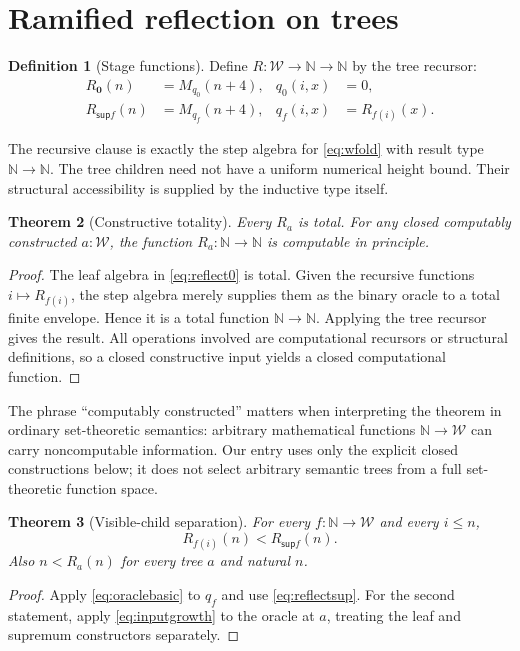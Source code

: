 \documentclass[11pt]{article}
\newtheorem{theorem}{Theorem}[section]
\theoremstyle{definition}
\newtheorem{definition}[theorem]{Definition}
\newcommand{\N}{\mathbb N}
\newcommand{\W}{\mathcal W}
\newcommand{\Sup}{\mathsf{sup}}
\newcommand{\leaf}{\mathbf 0}
\begin{document}
\section{Ramified reflection on trees}
\label{sec:reflection}

\begin{definition}[Stage functions]
Define $R:\W\to\N\to\N$ by the tree recursor:
\begin{align}
 R_{\leaf}(n)&=M_{q_0}(n+4),&q_0(i,x)&=0,\label{eq:reflect0}\\
 R_{\Sup f}(n)&=M_{q_f}(n+4),&q_f(i,x)&=R_{f(i)}(x).
 \label{eq:reflectsup}
\end{align}
\end{definition}
The recursive clause is exactly the step algebra for \eqref{eq:wfold} with
result type $\N\to\N$. The tree children need not have a uniform numerical
height bound. Their structural accessibility is supplied by the inductive
type itself.

\begin{theorem}[Constructive totality]\label{thm:totalR}
Every $R_a$ is total. For any closed computably constructed $a:\W$, the
function $R_a:\N\to\N$ is computable in principle.
\end{theorem}
\begin{proof}
The leaf algebra in \eqref{eq:reflect0} is total. Given the recursive
functions $i\mapsto R_{f(i)}$, the step algebra merely supplies them as the
binary oracle to a total finite envelope. Hence it is a total function
$\N\to\N$. Applying the tree recursor gives the result. All operations
involved are computational recursors or structural definitions, so a closed
constructive input yields a closed computational function.
\end{proof}

The phrase ``computably constructed'' matters when interpreting the theorem
in ordinary set-theoretic semantics: arbitrary mathematical functions
$\N\to\W$ can carry noncomputable information. Our entry uses only the
explicit closed constructions below; it does not select arbitrary semantic
trees from a full set-theoretic function space.

\begin{theorem}[Visible-child separation]\label{thm:child}
For every $f:\N\to\W$ and every $i\le n$,
\[
 R_{f(i)}(n)<R_{\Sup f}(n).
\]
Also $n<R_a(n)$ for every tree $a$ and natural $n$.
\end{theorem}
\begin{proof}
Apply \eqref{eq:oraclebasic} to $q_f$ and use
\eqref{eq:reflectsup}. For the second statement, apply
\eqref{eq:inputgrowth} to the oracle at $a$, treating the leaf and supremum
constructors separately.
\end{proof}
\end{document}
